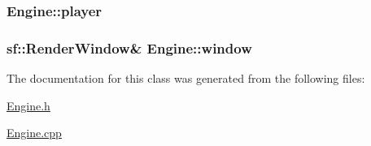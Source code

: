 \subsubsection[{player}]{ Engine\+::player}\label{class_engine_abd0ff72a70b7643680cff6cd0513620f}
\hypertarget{class_engine_ae5fb055a0acce41034a9bff218dd87b1}{}
\subsubsection[{window}]{\setlength{\rightskip}{0pt plus 5cm}sf\+::\+Render\+Window\& Engine\+::window\hspace{0.3cm}{\ttfamily [protected]}}\label{class_engine_ae5fb055a0acce41034a9bff218dd87b1}


The documentation for this class was generated from the following files\+:\begin{DoxyCompactItemize}
\item 
\hyperlink{_engine_8h}{Engine.\+h}\item 
\hyperlink{_engine_8cpp}{Engine.\+cpp}\end{DoxyCompactItemize}

